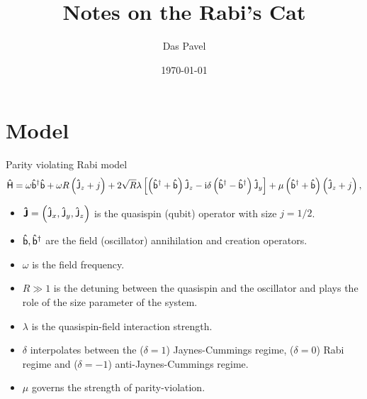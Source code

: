 \documentclass[a4paper,11pt,twoside]{article}
\begin{document}
\title{Notes on the Rabi's Cat}
\date{\today}
\author{Das Pavel}

\maketitle
\section{Model}
	Parity violating Rabi model
	\begin{equation}
		\label{eq:H}
		\mathsf{\hat{H}}=
			\omega{\mathsf{\hat{b}}}^{\dagger}\mathsf{\hat{b}}+\omega R\left(\mathsf{\hat{J}}_{z}+j\right)
			+2\sqrt{R}\lambda\left[\left({\mathsf{\hat{b}}}^{\dagger}+\mathsf{\hat{b}}\right)\mathsf{\hat{J}}_{z}-\mathrm{i}\delta\left({\mathsf{\hat{b}}}^{\dagger}-{\mathsf{\hat{b}}}^{\dagger}\right)\mathsf{\hat{J}}_{y}\right]
			+\mu\left({\mathsf{\hat{b}}}^{\dagger}+\mathsf{\hat{b}}\right)\left(\mathsf{\hat{J}}_{z}+j\right),
	\end{equation}
	\begin{itemize}
		\item
			$\boldsymbol{\mathsf{\hat{J}}}=\left(\mathsf{\hat{J}}_{x},\mathsf{\hat{J}}_{y},\mathsf{\hat{J}}_{z}\right)$ is the quasispin (qubit) operator with size $j=1/2$.

		\item 
			$\mathsf{\hat{b}},{\mathsf{\hat{b}}}^{\dagger}$ are the field (oscillator) annihilation and creation operators.

		\item 
			$\omega$ is the field frequency.

		\item
			$R\gg1$ is the detuning between the quasispin and the oscillator and plays the role of the size parameter of the system.

		\item 
			$\lambda$ is the quasispin-field interaction strength. 

		\item
			$\delta$ interpolates between the ($\delta=1$) Jaynes-Cummings regime, ($\delta=0$) Rabi regime and ($\delta=-1$) anti-Jaynes-Cummings regime.

		\item
			$\mu$ governs the strength of parity-violation.
	\end{itemize}
\end{document}
